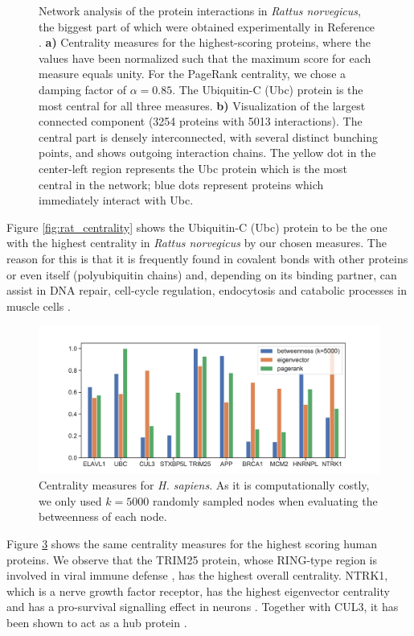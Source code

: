 \documentclass[9pt,onecolumn,twoside]{pnas-new}
\begin{document}
\begin{figure}
\begin{subfigure}{.58\textwidth}
    \vspace{-2.7em} 
    \caption{}
    \label{fig:rat_network}
\end{subfigure}
\caption{Network analysis of the protein interactions in \emph{Rattus norvegicus}, the biggest part of which were obtained experimentally in Reference \cite{na2013}. \textbf{a)} Centrality measures for the highest-scoring proteins, where the values have been normalized such that the maximum score for each measure equals unity. For the PageRank centrality, we chose a damping factor of $\alpha = 0.85$. The Ubiquitin-C (Ubc) protein is the most central for all three measures. \textbf{b)} Visualization of the largest connected component (3254 proteins with 5013 interactions). The central part is densely interconnected, with several distinct bunching points, and shows outgoing interaction chains. The yellow dot in the center-left region represents the Ubc protein which is the most central in the network; blue dots represent proteins which immediately interact with Ubc.}
\label{fig:test}
\end{figure}

Figure \ref{fig:rat_centrality} shows the Ubiquitin-C (Ubc) protein to be the one with the highest centrality in \emph{Rattus norvegicus} by our chosen measures. The reason for this is that it is frequently found in covalent bonds with other proteins or even itself (polyubiquitin chains) and, depending on its binding partner, can assist in DNA repair, cell-cycle regulation, endocytosis and catabolic processes in muscle cells \cite{price2002}.

\begin{figure}
    \centering
    \includegraphics[width=0.8\columnwidth]{images/homosapiens_centrality.pdf}
    \caption{Centrality measures for \emph{H. sapiens}. As it is computationally costly, we only used $k=5000$ randomly sampled nodes when evaluating the betweenness of each node.}
    \label{fig:homosapiens_centrality}
\end{figure}

Figure \ref{fig:homosapiens_centrality} shows the same centrality measures for the highest scoring human proteins. We observe that the TRIM25 protein, whose RING-type region is involved in viral immune defense \cite{jung2007}, has the highest overall centrality. NTRK1, which is a nerve growth factor receptor, has the highest eigenvector centrality and has a pro-survival signalling effect in neurons \cite{ginty2011}. Together with CUL3, it has been shown to act as a hub protein \cite{shafiee2018}.
\end{document}
